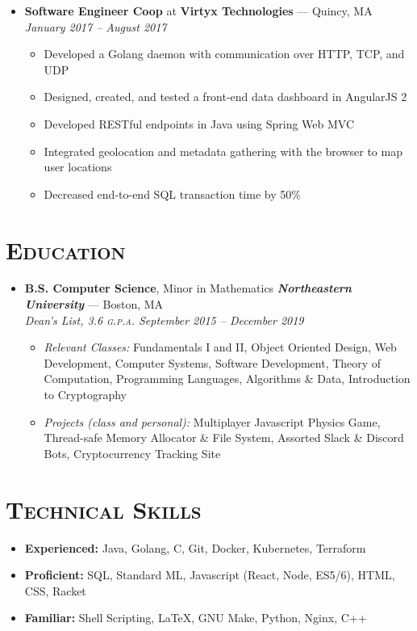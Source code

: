 \documentclass{article}
\begin{document}
\begin{itemize}[label={},leftmargin=*]
  \item \textbf{Software Engineer Coop} at \textbf{Virtyx Technologies} --- Quincy, MA \hfill {\em January 2017 -- August 2017}
  \begin{itemize}[label={$\bullet$}]
    \item Developed a Golang daemon with communication over HTTP, TCP, and UDP
    \item Designed, created, and tested a front-end data dashboard in AngularJS 2
    \item Developed RESTful endpoints in Java using Spring Web MVC
    \item Integrated geolocation and metadata gathering with the browser to map user locations
    \item Decreased end-to-end SQL transaction time by 50\%
  \end{itemize}
\end{itemize}

\section*{\textsc{Education}}
\begin{itemize}[label={},leftmargin=*]
  \item \textbf{B.S. Computer Science}, Minor in Mathematics \hfill \textit{\textbf{Northeastern University}} --- Boston, MA \\
  \em{Dean's List}, 3.6 \textsc{g.p.a.}  \hfill \em{\textit{September 2015 -- December 2019}}
  \begin{itemize}
    \item[] \textit{Relevant Classes:} Fundamentals I and II, Object Oriented Design, Web Development, Computer Systems, Software Development, Theory of Computation, Programming Languages, Algorithms \& Data, Introduction to Cryptography\\
    \item[] \textit{Projects (class and personal):} Multiplayer Javascript Physics Game, Thread-safe Memory Allocator \& File System, Assorted Slack \& Discord Bots, Cryptocurrency Tracking Site
  \end{itemize}
\end{itemize}

\section*{\textsc{Technical Skills}}
\begin{itemize}[label={},leftmargin=*]
  \item \textbf{Experienced:} Java, Golang, C, Git, Docker, Kubernetes, Terraform
  \item \textbf{Proficient:} SQL, Standard ML, Javascript (React, Node, ES5/6), HTML, CSS, Racket
  \item \textbf{Familiar:} Shell Scripting, LaTeX, GNU Make, Python, Nginx, C++
\end{itemize}
\end{document}

